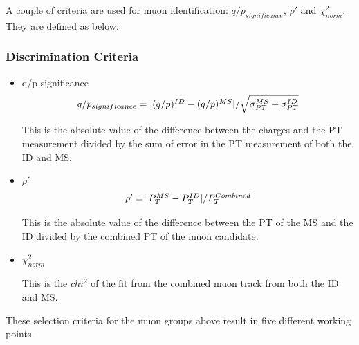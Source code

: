 A couple of criteria are used for muon identification: $q/p_{significance}$, $\rho'$ and $\chi^{2}_{norm}$. They are defined as below:

\subsubsection*{Discrimination Criteria}
\begin{itemize}

\item q/p significance
    \begin{equation}
    $$ q/p_{significance} = |(q/p)^{ID} - (q/p)^{MS}|/\sqrt{\sigma^{MS}_{PT} + \sigma^{ID}_{PT}} $$
    \end{equation}

This is the absolute value of the difference between the charges and the PT measurement divided by the sum of error in the PT measurement of both the ID and MS.

\item $\rho'$
    \begin{equation}
    $$ \rho' = |P_{T}^{MS} - P_{T}^{ID}| / P_{T}^{Combined} $$
    \end{equation}

This is the absolute value of the difference between the PT of the MS and the ID divided by the combined PT of the muon candidate.

\item $\chi_{norm}^{2}$

    This is the $chi^{2}$ of the fit from the combined muon track from both the ID and MS.

\end{itemize}

These selection criteria for the muon groups above result in five different working points.


